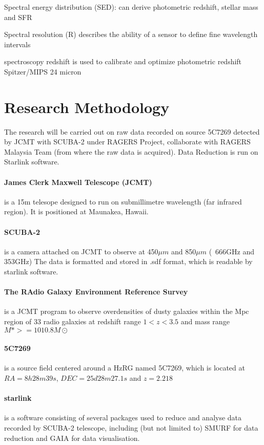 \documentclass{article}
\begin{document}
{Spectral energy distribution (SED):
can derive photometric redshift, stellar mass and SFR

Spectral resolution (R) describes the ability of a sensor to define fine wavelength intervals

spectroscopy redshift is used to calibrate and optimize photometric redshift
Spitzer/MIPS 24 micron

\section{Research Methodology}

The research will be carried out on raw data recorded on source 5C7269 detected by JCMT with SCUBA-2 under RAGERS Project, collaborate with RAGERS Malaysia Team (from where the raw data is acquired). Data Reduction is run on Starlink software.

\paragraph{James Clerk Maxwell Telescope (JCMT)} is a 15m telesope designed to run on submillimetre wavelength (far infrared region). It is positioned at Maunakea, Hawaii.

\paragraph{SCUBA-2} is a camera attached on JCMT to observe at 450$\mu m$ and 850$\mu m$ (~666GHz and 353GHz) The data is formatted and stored in .sdf format, which is readable by starlink software.

\paragraph{The RAdio Galaxy Environment Reference Survey} is a JCMT program to observe overdensities of dusty galaxies within the Mpc region of 33 radio galaxies at redshift range $1 < z < 3.5$ and mass range $M\ast >=1010.8M\odot $ 

\paragraph{5C7269} is a source field centered around a HzRG named 5C7269, which is located at $RA = 8h28m39s$, $DEC = 25d28m27.1s$ and $z = 2.218$ 

\paragraph{starlink} is a software consisting of several packages used to reduce and analyse data recorded by SCUBA-2 telescope, including (but not limited to) SMURF for data reduction and GAIA for data visualisation.

}
\end{document}
